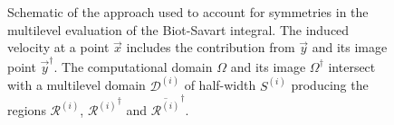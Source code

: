 \documentclass[11pt]{article}
\begin{document}
\begin{figure}
    \centering
    \def\svgwidth{0.5\columnwidth}
    
    \caption{Schematic of the approach used to account for symmetries in the multilevel evaluation of the Biot-Savart integral. The induced velocity at a point $\vec{x}$ includes the contribution from $\vec{y}$ and its image point $\vec{y}^\dagger$. The computational domain $\Omega$ and its image $\Omega^\dagger$ intersect with a multilevel domain $\mathcal{D}^{(i)}$ of half-width $S^{(i)}$ producing the regions $\mathcal{R}^{(i)}$, ${\mathcal{R}^{(i)}}^\dagger$ and $\overline{\mathcal{R}^{(i)}}^\dagger$.}
    \label{a1:fig_1}
\end{figure}



\end{document}
